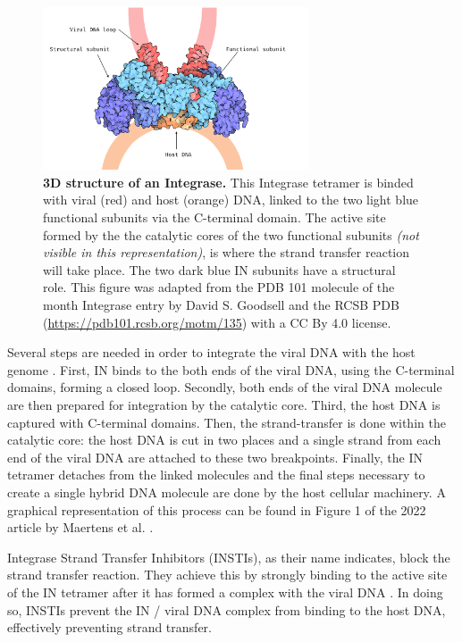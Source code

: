 \documentclass[
  11pt,
  twoside]{scrbook}
\newcommand{\extcaption}[2]{
    \caption[#1]{
        \textbf{#1}\newline
        #2
    }
}
\begin{document}
\begin{figure} 
  \centering 
  \includegraphics[width=0.7\textwidth]{./figures/HIV-Intro/in.png}      \extcaption{3D structure of an Integrase.}{This Integrase tetramer is binded with viral (red) and host (orange) DNA, linked to the two light blue functional subunits via the C-terminal domain. The active site formed by the the catalytic cores of the two functional subunits \textit{(not visible in this representation)}, is where the strand transfer reaction will take place. The two dark blue IN subunits have a structural role.
  This figure was adapted from the PDB 101 molecule of the month Integrase entry by David S. Goodsell and the RCSB PDB (\url{https://pdb101.rcsb.org/motm/135}) with a CC By 4.0 license.}       
  \label{fig:inStruct} 
\end{figure}

Several steps are needed in order to integrate the viral DNA with the host genome \autocite{maertensStructureFunctionRetroviral2022}. First, IN binds to the both ends of the viral DNA, using the C-terminal domains, forming a closed loop. Secondly, both ends of the viral DNA molecule are then prepared for integration by the catalytic core. Third, the host DNA is captured with C-terminal domains. Then, the strand-transfer is done within the catalytic core: the host DNA is cut in two places and a single strand from each end of the viral DNA are attached to these two breakpoints. Finally, the IN tetramer detaches from the linked molecules and the final steps necessary to create a single hybrid DNA molecule are done by the host cellular machinery. A graphical representation of this process can be found in Figure 1 of the 2022 article by Maertens et al. \autocite{maertensStructureFunctionRetroviral2022}.

Integrase Strand Transfer Inhibitors (INSTIs), as their name indicates, block the strand transfer reaction. They achieve this by strongly binding to the active site of the IN tetramer after it has formed a complex with the viral DNA \autocite{pommierIntegraseInhibitorsTreat2005,maertensStructureFunctionRetroviral2022}. In doing so, INSTIs prevent the IN / viral DNA complex from binding to the host DNA, effectively preventing strand transfer.
\end{document}
